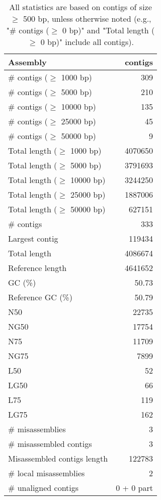 \documentclass[12pt,a4paper]{article}
\begin{document}
\begin{table}[ht]
\begin{center}
\caption{All statistics are based on contigs of size $\geq$ 500 bp, unless otherwise noted (e.g., "\# contigs ($\geq$ 0 bp)" and "Total length ($\geq$ 0 bp)" include all contigs).}
\begin{tabular}{|l*{1}{|r}|}
\hline
Assembly & contigs \\ \hline
\# contigs ($\geq$ 1000 bp) & 309 \\ \hline
\# contigs ($\geq$ 5000 bp) & 210 \\ \hline
\# contigs ($\geq$ 10000 bp) & 135 \\ \hline
\# contigs ($\geq$ 25000 bp) & 45 \\ \hline
\# contigs ($\geq$ 50000 bp) & 9 \\ \hline
Total length ($\geq$ 1000 bp) & 4070650 \\ \hline
Total length ($\geq$ 5000 bp) & 3791693 \\ \hline
Total length ($\geq$ 10000 bp) & 3244250 \\ \hline
Total length ($\geq$ 25000 bp) & 1887006 \\ \hline
Total length ($\geq$ 50000 bp) & 627151 \\ \hline
\# contigs & 333 \\ \hline
Largest contig & 119434 \\ \hline
Total length & 4086674 \\ \hline
Reference length & 4641652 \\ \hline
GC (\%) & 50.73 \\ \hline
Reference GC (\%) & 50.79 \\ \hline
N50 & 22735 \\ \hline
NG50 & 17754 \\ \hline
N75 & 11709 \\ \hline
NG75 & 7899 \\ \hline
L50 & 52 \\ \hline
LG50 & 66 \\ \hline
L75 & 119 \\ \hline
LG75 & 162 \\ \hline
\# misassemblies & 3 \\ \hline
\# misassembled contigs & 3 \\ \hline
Misassembled contigs length & 122783 \\ \hline
\# local misassemblies & 2 \\ \hline
\# unaligned contigs & 0 + 0 part \\ \hline

\end{tabular}
\end{center}
\end{table}
\end{document}
